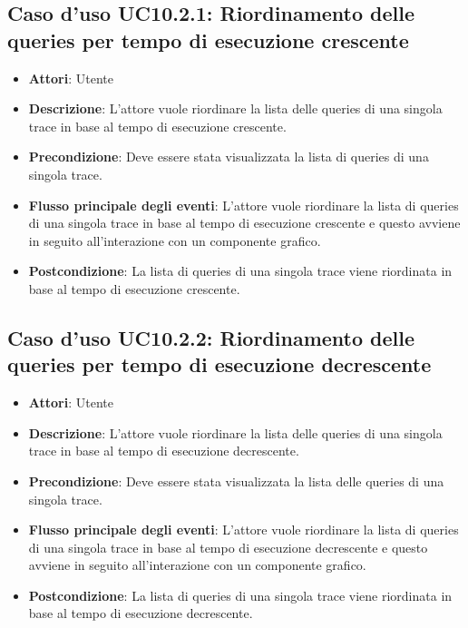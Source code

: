 \subsection{Caso d'uso UC10.2.1: Riordinamento delle queries per tempo di esecuzione crescente}
\begin{itemize}
\item \textbf{Attori}: Utente
\item \textbf{Descrizione}: L'attore vuole riordinare la lista delle queries di una singola trace in base al tempo di esecuzione crescente.
\item \textbf{Precondizione}: Deve essere stata visualizzata la lista di queries di una singola trace.
\item \textbf{Flusso principale degli eventi}: L'attore vuole riordinare la lista di queries di una singola trace in base al tempo di esecuzione crescente e questo avviene in seguito all'interazione con un componente grafico.
\item \textbf{Postcondizione}: La lista di queries di una singola trace viene riordinata in base al tempo di esecuzione crescente.
\end{itemize}
\subsection{Caso d'uso UC10.2.2: Riordinamento delle queries per tempo di esecuzione decrescente}
\begin{itemize}
\item \textbf{Attori}: Utente
\item \textbf{Descrizione}: L'attore vuole riordinare la lista delle queries di una singola trace in base al tempo di esecuzione decrescente.
\item \textbf{Precondizione}: Deve essere stata visualizzata la lista delle queries di una singola trace.
\item \textbf{Flusso principale degli eventi}: L'attore vuole riordinare la lista di queries di una singola trace in base al tempo di esecuzione decrescente e questo avviene in seguito all'interazione con un componente grafico.
\item \textbf{Postcondizione}: La lista di queries di una singola trace viene riordinata in base al tempo di esecuzione decrescente.
\end{itemize}
